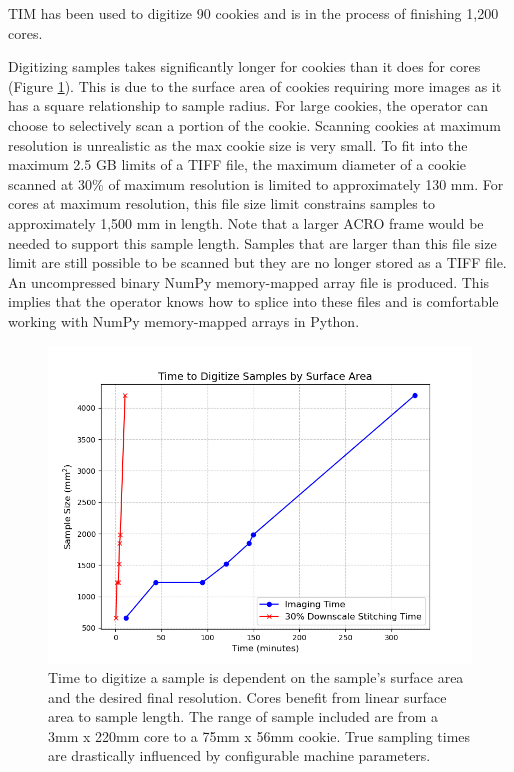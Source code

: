 \documentclass[a4paper,12pt]{article}
\begin{document}
TIM has been used to digitize 90 cookies and is in the process of finishing 1,200 cores. %

Digitizing samples takes significantly longer for cookies than it does for cores (Figure \ref{fig:digitization_time}). This is due to the surface area of cookies requiring more images as it has a square relationship to sample radius.
For large cookies, the operator can choose to selectively scan a portion of the cookie. Scanning cookies at maximum resolution is unrealistic as the max cookie size is very small. 
To fit into the maximum 2.5 GB limits of a TIFF file, the maximum diameter of a cookie scanned at 30\% of maximum resolution is limited to approximately 130 mm. For cores at maximum resolution, this file size limit 
constrains samples to approximately 1,500 mm in length. Note that a larger ACRO frame would be needed to support this sample length. Samples that are larger than this file size limit are still possible to be scanned but they are no longer stored as a TIFF file. 
An uncompressed binary NumPy memory-mapped array file is produced. This implies that the operator knows how to splice into these files and is comfortable working with NumPy memory-mapped arrays in Python.

\begin{figure}
    \centering
    \includegraphics[height=0.5\linewidth]{../../code/plots/time_and_area.png}
    \caption{Time to digitize a sample is dependent on the sample's surface area and the desired final resolution.
    Cores benefit from linear surface area to sample length. The range of sample included are from a 3mm x 220mm core to a 75mm x 56mm cookie. True sampling times are drastically influenced by configurable machine parameters.} %
    \label{fig:digitization_time}
\end{figure}
\end{document}
